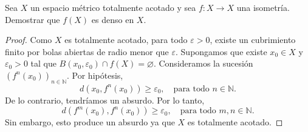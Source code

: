\begin{exercise}
    Sea $X$ un espacio métrico totalmente acotado y sea $f : X \to X$ una isometría. Demostrar que $f(X)$ es denso en $X$.
\end{exercise}

\begin{proof}
    Como $X$ es totalmente acotado, para todo $\varepsilon > 0$, existe un cubrimiento finito por bolas abiertas de radio menor que $\varepsilon$. Supongamos que existe $x_0 \in X$ y $\varepsilon_0 > 0$ tal que $B(x_0, \varepsilon_0) \cap f(X) = \varnothing$. Consideramos la sucesión $(f^n(x_0))_{n \in \mathbb{N}}$. Por hipótesis, 
    \begin{equation*}
        d(x_0, f^n(x_0)) \geq \varepsilon_0, \quad \text{para todo } n \in \mathbb{N}.
    \end{equation*}
    De lo contrario, tendríamos un absurdo. Por lo tanto,
    \begin{equation*}
        d(f^m(x_0), f^n(x_0)) \geq \varepsilon_0, \quad \text{para todo } m, n \in \mathbb{N}.
    \end{equation*}
    Sin embargo, esto produce un absurdo ya que $X$ es totalmente acotado.
\end{proof}